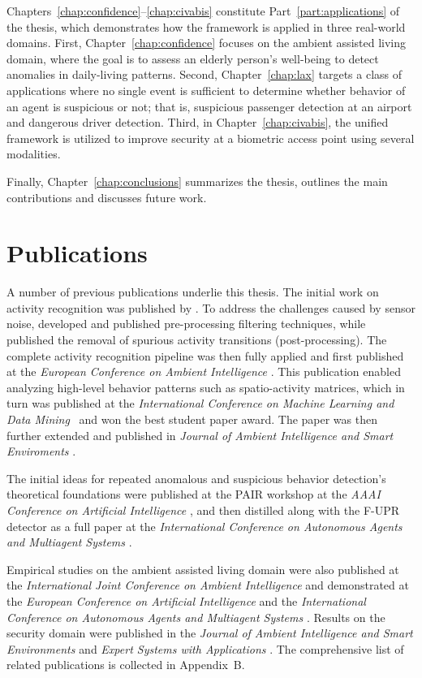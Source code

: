 Chapters~\ref{chap:confidence}--\ref{chap:civabis} constitute Part~\ref{part:applications} of the thesis, which demonstrates how the framework is applied in three real-world domains. First,  Chapter~\ref{chap:confidence} focuses on the ambient assisted living domain, where the goal is to assess an elderly person's well-being to detect anomalies in daily-living patterns.
Second, Chapter~\ref{chap:lax} targets a class of applications where no single event is sufficient to determine whether behavior of an agent is suspicious or not; that is, suspicious passenger detection at an airport and dangerous driver detection. Third, in Chapter~\ref{chap:civabis}, the unified framework is utilized to improve security at a biometric access point using several modalities.

Finally, Chapter~\ref{chap:conclusions} summarizes the thesis, outlines the main contributions and discusses future work.


\section{Publications}
A number of previous publications underlie this thesis. The initial work on activity recognition was published by \cite{Lustrek2009Fall}. To address the challenges caused by sensor noise, \cite{Kaluza2009Glajenje} developed and published pre-processing filtering techniques, while \cite{Kaluza09Reducing} published the removal of spurious activity transitions (post-processing). The complete activity recognition pipeline was then fully applied and first published at the \textit{European Conference on Ambient Intelligence} \citep{Lustrek2009Behavior}. This publication enabled analyzing high-level behavior patterns such as spatio-activity matrices, which in turn was published at the \textit{International Conference on Machine Learning and Data Mining}~\citep{Kaluza2010ADL} and won the best student paper award. The paper was then further extended and published in \textit{Journal of Ambient Intelligence and Smart Enviroments} \citep{Kaluza2012:JAISE}.

The initial ideas for repeated anomalous and suspicious behavior detection's theoretical foundations were published at the PAIR workshop at the \textit{AAAI Conference on Artificial Intelligence} \citep{Kaluza2011:PAIR}, and then distilled along with the F-UPR detector as a full paper at the \textit{International Conference on Autonomous Agents and Multiagent Systems} \citep{Kaluza2012:AAMAS}.

Empirical studies on the ambient assisted living domain were also published at the \emph{International Joint Conference on Ambient Intelligence} \citep{Kaluza2010Agentbased} and demonstrated at the \textit{European Conference on Artificial Intelligence} \citep{Lustrek2012:ECAI} and the \textit{International Conference on Autonomous Agents and Multiagent Systems} \citep{Kaluza2012:AAMASdemo}. Results on the security domain were published in the \textit{Journal of Ambient Intelligence and Smart Environments} \citep{Dovgan2010jami} and \textit{Expert Systems with Applications} \citep{Kaluza2010:ESWA}. The comprehensive list of related publications is collected in Appendix~B.




